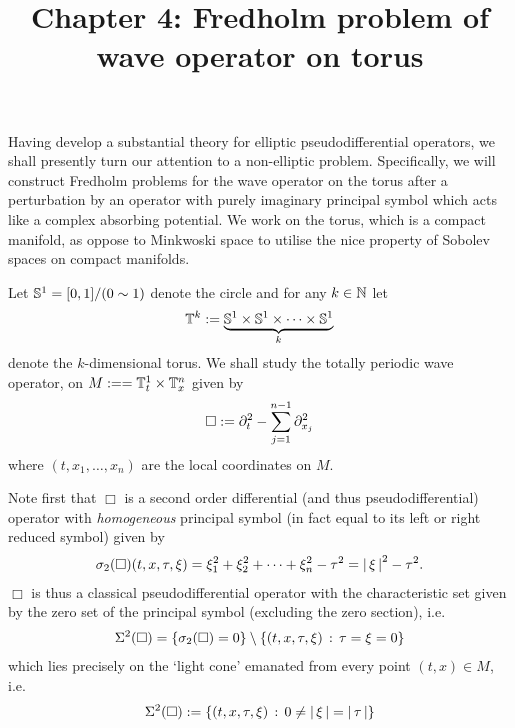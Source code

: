 \documentclass[12pt]{article}
\title{Chapter 4: Fredholm problem of wave operator on torus}
\date{}
\begin{document}
\maketitle

Having develop a substantial theory for elliptic pseudodifferential operators, we shall presently turn our attention to a non-elliptic problem. Specifically, we will construct Fredholm problems for the wave operator on the torus after a perturbation by an operator with purely imaginary principal symbol which acts like a complex absorbing potential. We work on the torus, which is a compact manifold,  as oppose to Minkwoski space to utilise the nice property of Sobolev spaces on compact manifolds. \\

\begin{fdefinition} 
Let $\S^1 = [0,1] / (0 \sim 1)$ denote the circle and for any $k \in \N$ let
\begin{align*}
\T^k := \underbrace{\S^1 \times \S^1 \times \dots \times \S^1}_{k}
\end{align*}
denote the $k$-dimensional torus. We shall study the totally periodic wave operator, on $M :=  = \T_t^1 \times \T_x^{n}$ given by
\begin{align}\label{eq: d'Alembertian}
\Box := \p_t^2 - \sum_{j = 1}^{n -1} \p_{x_j}^2
\end{align}
where $(t, x_1, \dots, x_n)$ are the local coordinates on $M$. 
\end{fdefinition}

Note first that $\Box$ is a second order differential (and thus pseudodifferential) operator with \textit{homogeneous} principal symbol (in fact equal to its left or right reduced symbol) given by 
\begin{align*}
\sigma_2(\Box)(t, x, \tau, \xi) = \xi_1^2 + \xi_2^2 + \dots + \xi_{n}^2 - \tau^2 = \abs{\xi}^2 - \tau^2. 
\end{align*}
$\Box$ is thus a classical pseudodifferential operator with  the characteristic set given by the zero set of the principal symbol (excluding the zero section), i.e. 
\begin{align*}
\Char^2(\Box) = \set{\sigma_2(\Box) = 0} \setminus \set{(t, x, \tau, \xi) \wh \tau = \xi = 0}
\end{align*}
which lies precisely on the `light cone' emanated from every point $(t, x) \in M$, i.e.  
\begin{align*}
\Char^2(\Box) := \set{(t, x, \tau, \xi) \wh 0 \neq \abs{\xi}  = \abs{\tau}} 
\end{align*} 
\end{document}
